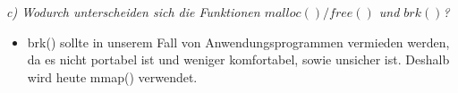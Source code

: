 \documentclass[a4paper]{article}
\begin{document}
\textit{c) Wodurch unterscheiden sich die Funktionen $malloc()/free()$ und $brk()$?}
\vspace{10mm}
\begin{itemize}
	\item brk() sollte in unserem Fall von Anwendungsprogrammen vermieden werden, da es nicht portabel ist und weniger komfortabel, sowie unsicher ist. Deshalb wird heute mmap() verwendet.
\end{itemize}
\end{document}
